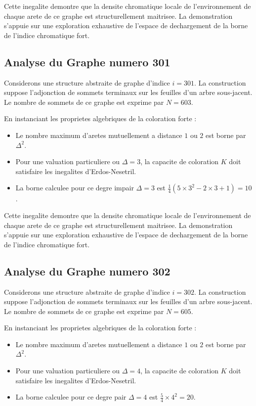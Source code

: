 \documentclass[11pt,a4paper]{article}
\begin{document}
Cette inegalite demontre que la densite chromatique locale de l'environnement de chaque arete de ce graphe est structurellement maitrisee. La demonstration s'appuie sur une exploration exhaustive de l'espace de dechargement de la borne de l'indice chromatique fort.

\subsection{Analyse du Graphe numero 301}
Considerons une structure abstraite de graphe d'indice $i = 301$. La construction suppose l'adjonction de sommets terminaux sur les feuilles d'un arbre sous-jacent. Le nombre de sommets de ce graphe est exprime par $N = 603$.

En instanciant les proprietes algebriques de la coloration forte :
\begin{itemize}
\item Le nombre maximum d'aretes mutuellement a distance $1$ ou $2$ est borne par $\Delta^2$.
\item Pour une valuation particuliere ou $\Delta = 3$, la capacite de coloration $K$ doit satisfaire les inegalites d'Erdos-Nesetril.
\item La borne calculee pour ce degre impair $\Delta = 3$ est $\frac{1}{4}(5 \times 3^2 - 2 \times 3 + 1) = 10$.
\end{itemize}

Cette inegalite demontre que la densite chromatique locale de l'environnement de chaque arete de ce graphe est structurellement maitrisee. La demonstration s'appuie sur une exploration exhaustive de l'espace de dechargement de la borne de l'indice chromatique fort.

\subsection{Analyse du Graphe numero 302}
Considerons une structure abstraite de graphe d'indice $i = 302$. La construction suppose l'adjonction de sommets terminaux sur les feuilles d'un arbre sous-jacent. Le nombre de sommets de ce graphe est exprime par $N = 605$.

En instanciant les proprietes algebriques de la coloration forte :
\begin{itemize}
\item Le nombre maximum d'aretes mutuellement a distance $1$ ou $2$ est borne par $\Delta^2$.
\item Pour une valuation particuliere ou $\Delta = 4$, la capacite de coloration $K$ doit satisfaire les inegalites d'Erdos-Nesetril.
\item La borne calculee pour ce degre pair $\Delta = 4$ est $\frac{5}{4} \times 4^2 = 20$.
\end{itemize}
\end{document}
